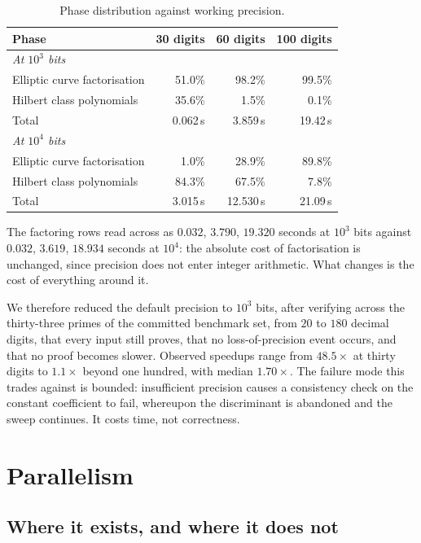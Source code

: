 \documentclass[11pt,a4paper]{article}
\begin{document}
\begin{table}[t]
\centering
\begin{tabular}{lrrr}
\toprule
Phase & 30 digits & 60 digits & 100 digits \\
\midrule
\multicolumn{4}{l}{\emph{At $10^3$ bits}} \\
Elliptic curve factorisation & 51.0\% & 98.2\% & 99.5\% \\
Hilbert class polynomials    & 35.6\% & 1.5\%  & 0.1\% \\
Total                        & 0.062\,s & 3.859\,s & 19.42\,s \\
\midrule
\multicolumn{4}{l}{\emph{At $10^4$ bits}} \\
Elliptic curve factorisation & 1.0\%  & 28.9\% & 89.8\% \\
Hilbert class polynomials    & 84.3\% & 67.5\% & 7.8\% \\
Total                        & 3.015\,s & 12.530\,s & 21.09\,s \\
\bottomrule
\end{tabular}
\caption{Phase distribution against working precision.}
\label{tab:phases}
\end{table}

The factoring rows read across as $0.032$, $3.790$, $19.320$ seconds at
$10^3$ bits against $0.032$, $3.619$, $18.934$ seconds at $10^4$: the
absolute cost of factorisation is unchanged, since precision does not
enter integer arithmetic. What changes is the cost of everything around
it.

We therefore reduced the default precision to $10^3$ bits, after
verifying across the thirty-three primes of the committed benchmark
set, from $20$ to $180$ decimal digits, that
every input still proves, that no loss-of-precision event occurs, and
that no proof becomes slower. Observed speedups range from $48.5\times$ at
thirty digits to $1.1\times$ beyond one hundred, with median
$1.70\times$. The failure mode this
trades against is bounded: insufficient precision causes a
consistency check on the constant coefficient to fail, whereupon the
discriminant is abandoned and the sweep continues. It costs time, not
correctness.

\section{Parallelism}
\label{sec:parallel}

\subsection{Where it exists, and where it does not}
\end{document}

